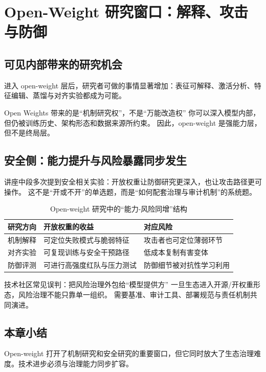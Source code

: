 \section{Open-Weight 研究窗口：解释、攻击与防御}

\subsection{可见内部带来的研究机会}
进入 open-weight 层后，研究者可做的事情显著增加：表征可解释、激活分析、特征编辑、蒸馏与对齐实验都成为可能。

\begin{importantbox}{Open Weights 带来的是“机制研究权”，不是“万能改造权”}
你可以深入模型内部，但仍被训练历史、架构形态和数据来源所约束。  
因此，open-weight 是强能力层，但不是终局层。
\end{importantbox}

\subsection{安全侧：能力提升与风险暴露同步发生}
讲座中段多次提到安全相关实验：开放权重让防御研究更深入，也让攻击路径更可操作。  
这不是“开或不开”的单选题，而是“如何配套治理与审计机制”的系统题。

\begin{table}[H]
\centering
\begin{tabular}{p{2.8cm}p{4.0cm}p{4.8cm}}
\toprule
\textbf{研究方向} & \textbf{开放权重的收益} & \textbf{对应风险} \\
\midrule
机制解释 & 可定位失败模式与脆弱特征 & 攻击者也可定位薄弱环节 \\
对齐实验 & 可复现训练与安全干预路径 & 低成本复制有害变体 \\
防御评测 & 可进行高强度红队与压力测试 & 防御细节被对抗性学习利用 \\
\bottomrule
\end{tabular}
\caption{Open-weight 研究中的“能力-风险同增”结构}
\end{table}

\begin{warningbox}{技术社区常见误判：把风险治理外包给“模型提供方”}
一旦生态进入开源/开权重形态，风险治理不能只靠单一组织。  
需要基准、审计工具、部署规范与责任机制共同演进。
\end{warningbox}

\subsection{本章小结}
Open-weight 打开了机制研究和安全研究的重要窗口，但它同时放大了生态治理难度。技术进步必须与治理能力同步扩容。


